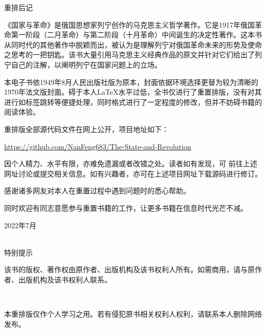 \clearpage
\pagestyle{empty}
\setcounter{page}{1}
\label{afterword}
\begin{center}
	\xbsong 重\hspace{0.333em}排\hspace{0.333em}后\hspace{0.333em}记
\end{center}
\vspace{1em}

\ykai

\id

\id 《国家与革命》是俄国思想家列宁创作的马克思主义哲学著作。它是1917年俄国革命第一阶段（二月革命）与第二阶段（十月革命）中间诞生的决定性著作。这本书从同时代的其他著作中脱颖而出，被认为是理解列宁对俄国革命未来的形势及使命之思考的一把钥匙。该书大量引用马克思主义经典作品的原文并针对它们给出了列宁自己的注解，以阐明列宁在国家问题上的立场。

\id 本电子书依1949年8月人民出版社版为原本，封面依据环境选择更替为较为清晰的1970年法文版封面。碍于本人\LaTeX 水平过低，全书仅进行了重置排版，没有对其进行如标签跳转等便捷处理，同时格式进行了一定程度的修改，但并不妨碍书籍的阅读体验。

\id 重排版全部源代码文件在网上公开，项目地址如下：
\begin{center}
	\href{https://github.com/NanFeng683/The-State-and-Revolution}{https://github.com/NanFeng683/The-State-and-Revolution}
\end{center}

\id 因个人精力、水平有限，亦难免遗漏或者改错之处。读者如有发现，可
前往上述网址讨论或提交相关信息。如有兴趣者，亦可在上述项目网址下载源码进行修订。

\id 感谢诸多网友对本人在重置过程中遇到问题时的悉心帮助。

\id 同时欢迎有同志意愿参与重置书籍的工作，让更多书籍在信息时代光芒不减。


\null{}

\hspace{7cm}

\mbox{}

\hspace{6.5cm}\normalfont{} 2022年7月\normalsize

\newpage
\label{tips}
\heiti {}
\begin{center}
	~\\
	特\hspace{0.333em}别\hspace{0.333em}提\hspace{0.333em}示
\end{center}
\normalsize
\vspace{1em}

该书的版权、著作权由原作者、出版机构及该书权利人所有。如需商用，请与原作者、出版机构及该书权利人联系。

~

本重排版仅作个人学习之用。若有侵犯原书相关权利人权利，请联系本人删除网络发布。

\clearpage